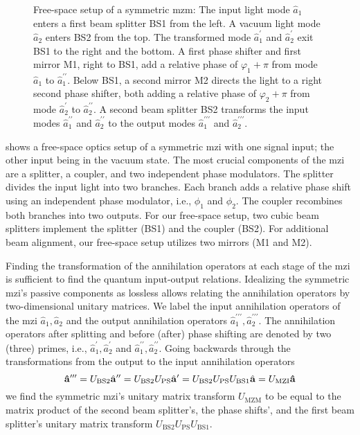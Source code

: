 \begin{figure}[htb]
	\centering
	
	\caption{Free-space setup of a symmetric \gls{mzm}: The input light mode $\hat{a}_1$ enters a first beam splitter BS1 from the left. A vacuum light mode $\hat{a}_2$ enters BS2 from the top. The transformed mode $\hat{a}_1^\prime$ and $\hat{a}_2^\prime$ exit BS1 to the right and the bottom. A first phase shifter and first mirror M1, right to BS1, add a relative phase of $\varphi_1+\pi$ from mode $\hat{a}_1$ to $\hat{a}_1^{\prime\prime}$. Below BS1, a second mirror M2 directs the light to a right second phase shifter, both adding a relative phase of $\varphi_2+\pi$ from mode $\hat{a}_2^\prime$ to $\hat{a}_2^{\prime\prime}$. A second beam splitter BS2 transforms the input modes $\hat{a}_1^{\prime\prime}$ and $\hat{a}_2^{\prime\prime}$ to the output modes $\hat{a}_1^{\prime\prime\prime}$ and $\hat{a}_2^{\prime\prime\prime}$.}\label{fig:mzi_symmetric}
\end{figure}
 shows a free-space optics setup of a symmetric \gls{mzi} with one signal input; the other input being in the vacuum state.
The most crucial components of the \gls{mzi} are a splitter, a coupler, and two independent phase modulators.
The splitter divides the input light into two branches.
Each branch adds a relative phase shift using an independent phase modulator, i.e., $\phi_1$ and $\phi_2$.
The coupler recombines both branches into two outputs.
For our free-space setup, two cubic beam splitters implement the splitter (BS1) and the coupler (BS2).
For additional beam alignment, our free-space setup utilizes two mirrors (M1 and M2).

Finding the transformation of the annihilation operators at each stage of the \gls{mzi} is sufficient to find the quantum input-output relations.
Idealizing the symmetric \gls{mzi}'s passive components as lossless allows relating the annihilation operators by two-dimensional unitary matrices.
We label the input annihilation operators of the \gls{mzi} $\hat{a}_1,\hat{a}_2$ and the output annihilation operators $\hat{a}_1^{\prime\prime\prime},\hat{a}_2^{\prime\prime\prime}$.
The annihilation operators after splitting and before (after) phase shifting are denoted by two (three) primes, i.e., $\hat{a}_1^{\prime},\hat{a}_2^{\prime}$ and $\hat{a}_1^{\prime\prime},\hat{a}_2^{\prime\prime}$.
Going backwards through the transformations from the output to the input annihilation operators
\begin{equation}
	\vb{\hat{a}}^{\prime\prime\prime}
	=
	U_\text{BS2}
	\hat{\vb{a}}^{\prime\prime}
	=
	U_\text{BS2}
	U_\text{PS}
	\hat{\vb{a}}^{\prime}
	=
	U_\text{BS2}
	U_\text{PS}
	U_\text{BS1}
	\hat{\vb{a}}
	=
	U_\text{MZI}
	\vb{\hat{a}}
\end{equation}
we find the symmetric \gls{mzi}'s unitary matrix transform $U_\text{MZM}$ to be equal to the matrix product of the second beam splitter's, the phase shifts', and the first beam splitter's unitary matrix transform  $U_\text{BS2}U_\text{PS}U_\text{BS1}$.

